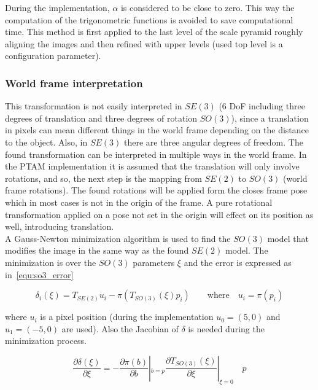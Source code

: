 During the implementation, $\alpha$ is considered to be close to zero. This way the computation of the trigonometric functions is avoided to save computational time. This method is first applied to the last level of the scale pyramid roughly aligning the images and then refined with upper levels (used top level is a configuration parameter). \\






\subsubsection{World frame interpretation}
\label{ssub:world_frame_interpretation}

This transformation is not easily interpreted in $SE(3)$ (6 DoF including three degrees of translation and three degrees of rotation $SO(3)$), since a translation in pixels can mean different things in the world frame depending on the distance to the object. Also, in $SE(3)$ there are three angular degrees of freedom. The found transformation can be interpreted in multiple ways in the world frame. In the PTAM implementation it is assumed that the translation will only involve rotations, and so, the next step is the mapping from $SE(2)$ to $SO(3)$ (world frame rotations). The found rotations will be applied form the closes frame pose which in most cases is not in the origin of the frame. A pure rotational transformation applied on a pose not set in the origin will effect on its position as well, introducing translation.\\

A Gauss-Newton minimization algorithm is used to find the $SO(3)$ model that modifies the image in the same way as the found $SE(2)$ model. The minimization is over the $SO(3)$ parameters $\xi$ and the error is expressed as in~\ref{equ:so3_error}

\begin{equation}
  \delta_i(\xi) = T_{SE(2)}u_i - \pi(T_{SO(3)}(\xi) p_i) \qquad \text{where} \quad u_i = \pi(p_i)
  \label{equ:so3_error}
\end{equation}


where $u_i$ is a pixel position (during the implementation $u_0=(5,0)$ and $u_1=(-5,0)$ are used). Also the Jacobian of $\delta$ is needed during the minimization process.

\begin{equation}
  \frac{\partial \delta(\xi)}{\partial \xi} = -\frac{\partial \pi (b)}{\partial b}|_{b=p} \frac{\partial T_{SO(3)}(\xi)}{\partial\xi}|_{\xi=0} \quad p
\end{equation}

